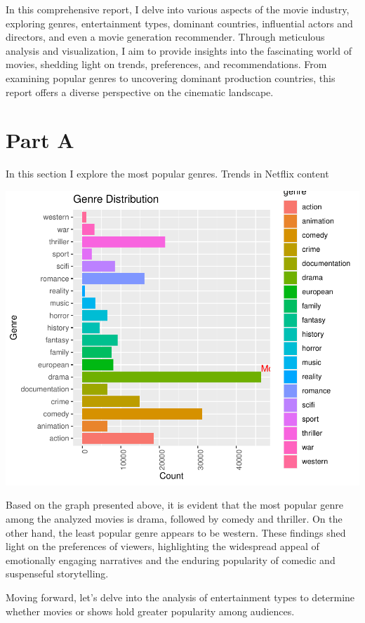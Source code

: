 \documentclass[11pt,preprint, authoryear]{elsarticle}
\numberwithin{equation}{section}
\numberwithin{figure}{section}
\numberwithin{table}{section}
\begin{document}
In this comprehensive report, I delve into various aspects of the movie
industry, exploring genres, entertainment types, dominant countries,
influential actors and directors, and even a movie generation
recommender. Through meticulous analysis and visualization, I aim to
provide insights into the fascinating world of movies, shedding light on
trends, preferences, and recommendations. From examining popular genres
to uncovering dominant production countries, this report offers a
diverse perspective on the cinematic landscape.

\hypertarget{part-a}{%
\section{Part A}\label{part-a}}

In this section I explore the most popular genres. Trends in Netflix
content

\includegraphics{Question4_files/figure-latex/unnamed-chunk-1-1.pdf}

Based on the graph presented above, it is evident that the most popular
genre among the analyzed movies is drama, followed by comedy and
thriller. On the other hand, the least popular genre appears to be
western. These findings shed light on the preferences of viewers,
highlighting the widespread appeal of emotionally engaging narratives
and the enduring popularity of comedic and suspenseful storytelling.

Moving forward, let's delve into the analysis of entertainment types to
determine whether movies or shows hold greater popularity among
audiences.
\end{document}
